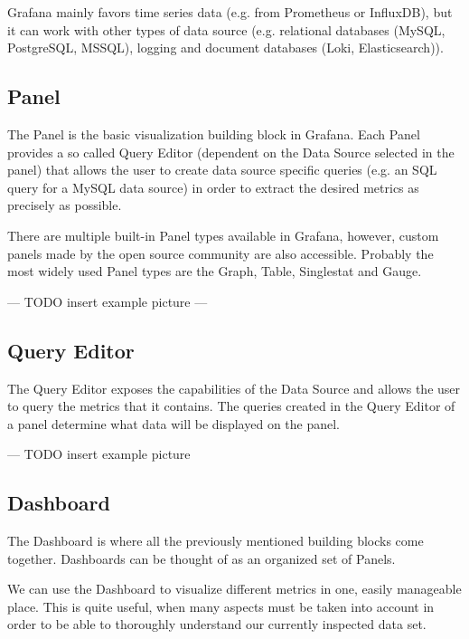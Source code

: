 Grafana mainly favors time series data (e.g. from Prometheus or InfluxDB), but it can work with other types of data source (e.g. relational databases (MySQL, PostgreSQL, MSSQL), logging and document databases (Loki, Elasticsearch)).

\subsection{Panel}

The Panel is the basic visualization building block in Grafana. Each Panel provides a so called Query Editor (dependent on the Data Source selected in the panel) that allows the user to create data source specific queries (e.g. an SQL query for a MySQL data source) in order to extract the desired metrics as precisely as possible.

There are multiple built-in Panel types available in Grafana, however, custom panels made by the open source community are also accessible. Probably the most widely used Panel types are the Graph, Table, Singlestat and Gauge.

\begin{center}
	--- TODO insert example picture ---
\end{center}

\subsection{Query Editor}

The Query Editor exposes the capabilities of the Data Source and allows the user to query the metrics that it contains. The queries created in the Query Editor of a panel determine what data will be displayed on the panel.

\begin{center}
	--- TODO insert example picture
\end{center}

\subsection{Dashboard}
The Dashboard is where all the previously mentioned building blocks come together. Dashboards can be thought of as an organized set of Panels.

We can use the Dashboard to visualize different metrics in one, easily manageable place. This is quite useful, when many aspects must be taken into account in order to be able to thoroughly understand our currently inspected data set.

